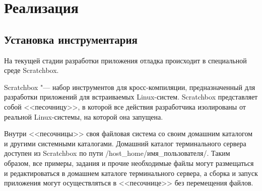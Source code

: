 \newpage
\chapter{Реализация}\label{ch:chapter_2}

\section{Установка инструментария}

На текущей стадии разработки приложения отладка происходит в специальной среде
Scratchbox.

Scratchbox "--- набор инструментов для кросс-компиляции, предназначенный для
разработки приложений для встраиваемых Linux-систем. Scratchbox представляет
собой <<песочницу>>, в которой все действия разработчика изолированы от реальной
Linux-системы, на которой она запущена.

Внутри <<песочницы>> своя файловая система со своим домашним каталогом и другими
системными каталогами. Домашний каталог терминального сервера доступен из
Scratchbox по пути /host\_home/имя\_пользователя/. Таким образом, все примеры,
задания и прочие необходимые файлы могут размещаться и редактироваться в
домашнем каталоге терминального сервера, а сборка и запуск приложения могут
осуществляться в <<песочнице>> без перемещения файлов.

